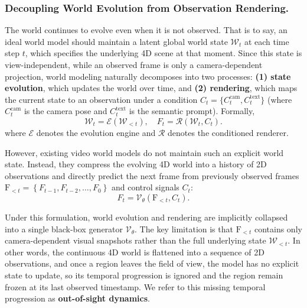 \subsubsection{Decoupling World Evolution from Observation Rendering.}
\label{sec:problem_formulation}
The world continues to evolve even when it is not observed. That is to say, an ideal world model should maintain a latent global world state $\mathcal{W}_{t}$ at each time step $t$, which specifies the underlying 4D scene at that moment. Since this state is view-independent, while an observed frame is only a camera-dependent projection, world modeling naturally decomposes into two processes: \textbf{(1) state evolution}, which updates the world over time, and \textbf{(2) rendering}, which maps the current state to an observation under a condition $C_t = \{C_t^{\text{cam}}, C_t^{\text{text}}\}$ (where $C_t^{\text{cam}}$ is the camera pose and $C_t^{\text{text}}$ is the semantic prompt). Formally,
\vspace{-1mm}
\begin{equation}
    \mathcal{W}_{t} = \mathcal{E}(\mathcal{W}_{<t}), \quad
    F_t = \mathcal{R}(\mathcal{W}_{t}, C_t).
    \label{eq:ideal_formulation}
\end{equation}
where $\mathcal{E}$ denotes the evolution engine and $\mathcal{R}$ denotes the conditioned renderer.

However, existing video world models do not maintain such an explicit world state. Instead, they compress the evolving 4D world into a history of 2D observations and directly predict the next frame from previously observed frames $\text{F}_{<t}=\left \{ F_{t-1}, F_{t-2},\dots ,F_0 \right \} $ and control signals $C_t$:
\begin{equation}
    F_t = \mathcal{V}_{\theta}(\text{F}_{<t}, C_t).
    \label{eq3:current_formulation}
\end{equation}

Under this formulation, world evolution and rendering are implicitly collapsed into a single black-box generator $\mathcal{V}_{\theta}$. The key limitation is that $\text{F}_{<t}$ contains only camera-dependent visual snapshots rather than the full underlying state $\mathcal{W}_{<t}$. In other words, the continuous 4D world is flattened into a sequence of 2D observations, and once a region leaves the field of view, the model has no explicit state to update, so its temporal progression is ignored and the region remain frozen at its last observed timestamp. We refer to this missing temporal progression as \textbf{out-of-sight dynamics}. 


